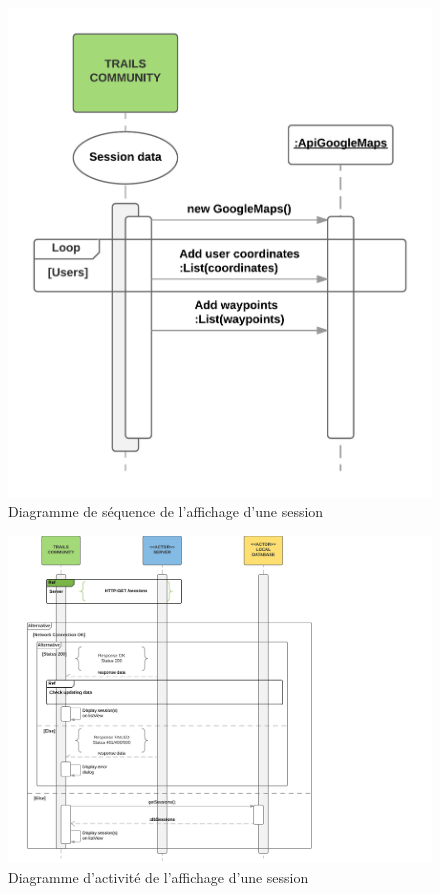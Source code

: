 \documentclass[titlepage, 12pt]{report}
\begin{document}
\clearpage


\begin{figure}[!h]
	\caption{Diagramme de séquence de l'affichage d'une session}
	\label{view_session_sequence_diagram}
	\centering
	\includegraphics[scale=0.7]{Images/diagram/view_session_sequence_diagram.png}
\end{figure}

\clearpage

\begin{figure}[!h]
	\caption{Diagramme d'activité de l'affichage d'une session}
	\label{view_session_activity_diagram}
	\centering
	\includegraphics[scale=0.2]{Images/diagram/view_session_activity_diagram.png}
\end{figure}
\end{document}
